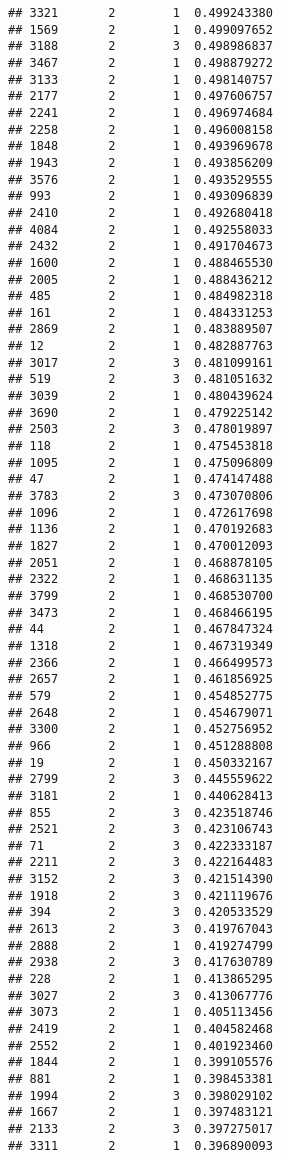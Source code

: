 \documentclass[
]{article}
\begin{document}
\begin{verbatim}
## 3321       2        1  0.499243380
## 1569       2        1  0.499097652
## 3188       2        3  0.498986837
## 3467       2        1  0.498879272
## 3133       2        1  0.498140757
## 2177       2        1  0.497606757
## 2241       2        1  0.496974684
## 2258       2        1  0.496008158
## 1848       2        1  0.493969678
## 1943       2        1  0.493856209
## 3576       2        1  0.493529555
## 993        2        1  0.493096839
## 2410       2        1  0.492680418
## 4084       2        1  0.492558033
## 2432       2        1  0.491704673
## 1600       2        1  0.488465530
## 2005       2        1  0.488436212
## 485        2        1  0.484982318
## 161        2        1  0.484331253
## 2869       2        1  0.483889507
## 12         2        1  0.482887763
## 3017       2        3  0.481099161
## 519        2        3  0.481051632
## 3039       2        1  0.480439624
## 3690       2        1  0.479225142
## 2503       2        3  0.478019897
## 118        2        1  0.475453818
## 1095       2        1  0.475096809
## 47         2        1  0.474147488
## 3783       2        3  0.473070806
## 1096       2        1  0.472617698
## 1136       2        1  0.470192683
## 1827       2        1  0.470012093
## 2051       2        1  0.468878105
## 2322       2        1  0.468631135
## 3799       2        1  0.468530700
## 3473       2        1  0.468466195
## 44         2        1  0.467847324
## 1318       2        1  0.467319349
## 2366       2        1  0.466499573
## 2657       2        1  0.461856925
## 579        2        1  0.454852775
## 2648       2        1  0.454679071
## 3300       2        1  0.452756952
## 966        2        1  0.451288808
## 19         2        1  0.450332167
## 2799       2        3  0.445559622
## 3181       2        1  0.440628413
## 855        2        3  0.423518746
## 2521       2        3  0.423106743
## 71         2        3  0.422333187
## 2211       2        3  0.422164483
## 3152       2        3  0.421514390
## 1918       2        3  0.421119676
## 394        2        3  0.420533529
## 2613       2        3  0.419767043
## 2888       2        1  0.419274799
## 2938       2        3  0.417630789
## 228        2        1  0.413865295
## 3027       2        3  0.413067776
## 3073       2        1  0.405113456
## 2419       2        1  0.404582468
## 2552       2        1  0.401923460
## 1844       2        1  0.399105576
## 881        2        1  0.398453381
## 1994       2        3  0.398029102
## 1667       2        1  0.397483121
## 2133       2        3  0.397275017
## 3311       2        1  0.396890093

\end{verbatim}
\end{document}

